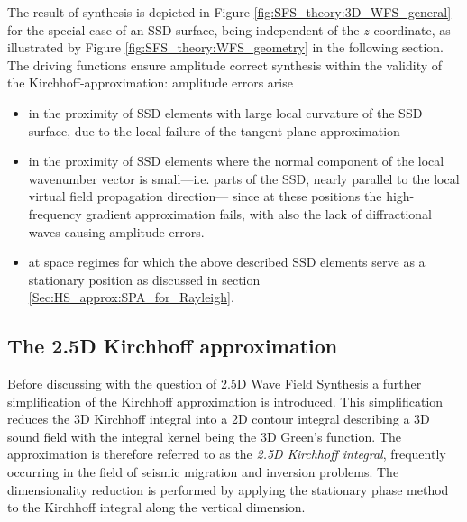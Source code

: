 The result of synthesis is depicted in Figure \ref{fig:SFS_theory:3D_WFS_general} for the special case of an SSD surface, being independent of the $z$-coordinate, as illustrated by Figure \ref{fig:SFS_theory:WFS_geometry} in the following section.
The driving functions ensure amplitude correct synthesis within the validity of the Kirchhoff-approximation:
amplitude errors arise 
\begin{itemize}
\item in the proximity of SSD elements with large local curvature of the SSD surface, due to the local failure of the tangent plane approximation
\item in the proximity of SSD elements where the normal component of the local wavenumber vector is small---i.e. parts of the SSD, nearly parallel to the local virtual field propagation direction--- since at these positions the high-frequency gradient approximation fails, with also the lack of diffractional waves causing amplitude errors.
\item at space regimes for which the above described SSD elements serve as a stationary position as discussed in section \ref{Sec:HS_approx:SPA_for_Rayleigh}.
\end{itemize}

\subsection{The 2.5D Kirchhoff approximation}

Before discussing with the question of 2.5D Wave Field Synthesis a further simplification of the Kirchhoff approximation is introduced.
This simplification reduces the 3D Kirchhoff integral into a 2D contour integral describing a 3D sound field with the integral kernel being the 3D Green's function.
The approximation is therefore referred to as the \emph{2.5D Kirchhoff integral}, frequently occurring in the field of seismic migration and inversion problems.
The dimensionality reduction is performed by applying the stationary phase method to the Kirchhoff integral along the vertical dimension.

